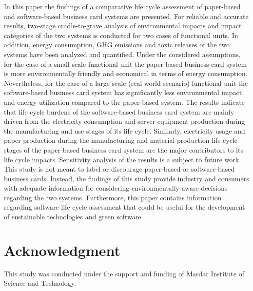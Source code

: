 \documentclass[3p,times,procedia]{elsarticle}
\begin{document}
In this paper the findings of a comparative life cycle assessment of paper-based and software-based business card systems are presented. For reliable and accurate results, two-stage cradle-to-grave analysis of environmental impacts and impact categories of the two systems is conducted for two cases of functional units. In addition, energy consumption, GHG emissions and toxic releases of the two systems have been analyzed and quantified. Under the considered assumptions, for the case of a small scale functional unit the paper-based business card system is more environmentally friendly and economical in terms of energy consumption. Nevertheless, for the case of a large scale (real world scenario) functional unit the software-based business card system has significantly less environmental impact and energy utilization compared to the paper-based system. The results indicate that life cycle burdens of the software-based business card system are mainly driven from
the electricity consumption and server equipment production
during the manufacturing and use stages of its life cycle. Similarly, electricity usage and paper production during the manufacturing and material production life cycle stages of the paper-based business card system are the major contributors to its life cycle impacts. Sensitivity analysis of the results is a subject to future work. This study is not meant to label or discourage paper-based or software-based business cards. Instead, the findings of this study provide industry and consumers with adequate information for considering environmentally aware decisions
regarding the two systems. Furthermore, this paper contains information regarding software life cycle assessment that could be useful for the development of sustainable technologies and green software. 

\section*{Acknowledgment}

This study was conducted under the support and funding of Masdar Institute of Science and Technology.



\end{document}
